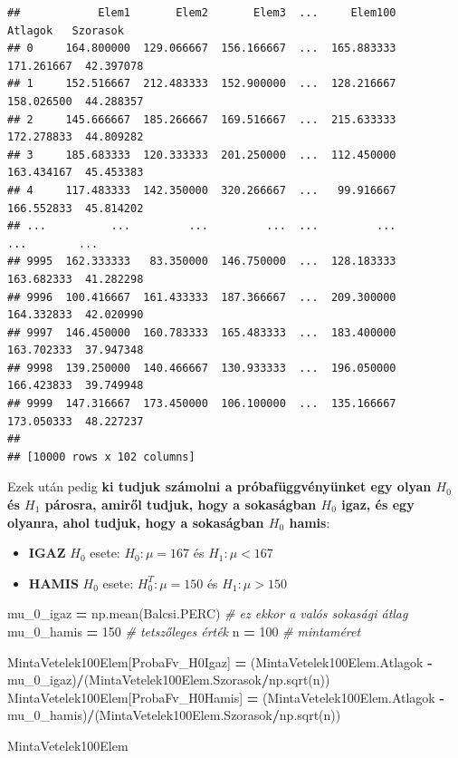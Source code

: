 \documentclass[
]{book}
\newenvironment{Shaded}{\begin{snugshade}}{\end{snugshade}}
\newcommand{\CommentTok}[1]{\textcolor[rgb]{0.56,0.35,0.01}{\textit{#1}}}
\newcommand{\DecValTok}[1]{\textcolor[rgb]{0.00,0.00,0.81}{#1}}
\newcommand{\NormalTok}[1]{#1}
\newcommand{\OperatorTok}[1]{\textcolor[rgb]{0.81,0.36,0.00}{\textbf{#1}}}
\newcommand{\StringTok}[1]{\textcolor[rgb]{0.31,0.60,0.02}{#1}}
\providecommand{\tightlist}{%
  \setlength{\itemsep}{0pt}\setlength{\parskip}{0pt}}
\begin{document}
\begin{verbatim}
##            Elem1       Elem2       Elem3  ...     Elem100     Atlagok   Szorasok
## 0     164.800000  129.066667  156.166667  ...  165.883333  171.261667  42.397078
## 1     152.516667  212.483333  152.900000  ...  128.216667  158.026500  44.288357
## 2     145.666667  185.266667  169.516667  ...  215.633333  172.278833  44.809282
## 3     185.683333  120.333333  201.250000  ...  112.450000  163.434167  45.453383
## 4     117.483333  142.350000  320.266667  ...   99.916667  166.552833  45.814202
## ...          ...         ...         ...  ...         ...         ...        ...
## 9995  162.333333   83.350000  146.750000  ...  128.183333  163.682333  41.282298
## 9996  100.416667  161.433333  187.366667  ...  209.300000  164.332833  42.020990
## 9997  146.450000  160.783333  165.483333  ...  183.400000  163.702333  37.947348
## 9998  139.250000  140.466667  130.933333  ...  196.050000  166.423833  39.749948
## 9999  147.316667  173.450000  106.100000  ...  135.166667  173.050333  48.227237
## 
## [10000 rows x 102 columns]
\end{verbatim}

Ezek után pedig \textbf{ki tudjuk számolni a próbafüggvényünket egy olyan \(H_0\) és \(H_1\) párosra, amiről tudjuk, hogy a sokaságban \(H_0\) igaz, és egy olyanra, ahol tudjuk, hogy a sokaságban \(H_0\) hamis}:

\begin{itemize}
\tightlist
\item
  \textbf{IGAZ} \(H_0\) esete: \(H_0:\mu=167\) és \(H_1: \mu < 167\)
\item
  \textbf{HAMIS} \(H_0\) esete: \(H_0^T:\mu=150\) és \(H_1: \mu > 150\)
\end{itemize}

\begin{Shaded}
\begin{Highlighting}[]
\NormalTok{mu\_0\_igaz }\OperatorTok{=}\NormalTok{ np.mean(Balcsi.PERC) }\CommentTok{\# ez ekkor a valós sokasági átlag}
\NormalTok{mu\_0\_hamis }\OperatorTok{=} \DecValTok{150} \CommentTok{\# tetszőleges érték}
\NormalTok{n }\OperatorTok{=} \DecValTok{100} \CommentTok{\# mintaméret}

\NormalTok{MintaVetelek100Elem[}\StringTok{\textquotesingle{}ProbaFv\_H0Igaz\textquotesingle{}}\NormalTok{] }\OperatorTok{=}\NormalTok{ (MintaVetelek100Elem.Atlagok }\OperatorTok{{-}}\NormalTok{ mu\_0\_igaz)}\OperatorTok{/}\NormalTok{(MintaVetelek100Elem.Szorasok}\OperatorTok{/}\NormalTok{np.sqrt(n))}
\NormalTok{MintaVetelek100Elem[}\StringTok{\textquotesingle{}ProbaFv\_H0Hamis\textquotesingle{}}\NormalTok{] }\OperatorTok{=}\NormalTok{ (MintaVetelek100Elem.Atlagok }\OperatorTok{{-}}\NormalTok{ mu\_0\_hamis)}\OperatorTok{/}\NormalTok{(MintaVetelek100Elem.Szorasok}\OperatorTok{/}\NormalTok{np.sqrt(n))}

\NormalTok{MintaVetelek100Elem}
\end{Highlighting}
\end{Shaded}
\end{document}
